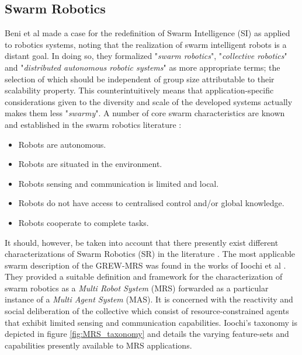 \documentclass{report}
\begin{document}
\subsection{Swarm Robotics}
Beni et al \cite{Beni2005a} made a case for the redefinition of Swarm Intelligence (SI) as applied to robotics systems, noting that the realization of swarm intelligent robots is a distant goal. In doing so, they formalized "\textit{swarm robotics}", "\textit{collective robotics}" and "\textit{distributed autonomous robotic systems}" as more appropriate terms; the selection of which should be independent of group size attributable to their scalability property. This counterintuitively means that application-specific considerations given to the diversity and scale of the developed systems actually makes them less "\textit{swarmy}".
\newpage
A number of core swarm characteristics are known and established in the swarm robotics literature \cite{Brambilla2013a}:
\begin{itemize}
	\item Robots are autonomous.
	\item Robots are situated in the environment.
	\item Robots sensing and communication is limited and local.
	\item Robots do not have access to centralised control and/or global knowledge.
	\item Robots cooperate to complete tasks.
\end{itemize}

It should, however, be taken into account that there presently exist different characterizations of Swarm Robotics (SR) in the literature \cite{Sahin2005} \cite{Beni2005a} \cite{Dorigo2013} \cite{DorigoSahin2004}. The most applicable swarm description of the GREW-MRS was found in the works of Ioochi et al \cite{Iocchi2001}. They provided a suitable definition and framework for the characterization of swarm robotics as a \textit{Multi Robot System} (MRS) forwarded as a particular instance of a \textit{Multi Agent System} (MAS). It is concerned with the reactivity and social deliberation of the collective which consist of resource-constrained agents that exhibit limited sensing and communication capabilities. Ioochi's taxonomy is depicted in figure \ref{fig:MRS_taxonomy} and details the varying feature-sets and capabilities presently available to MRS applications.
\end{document}

